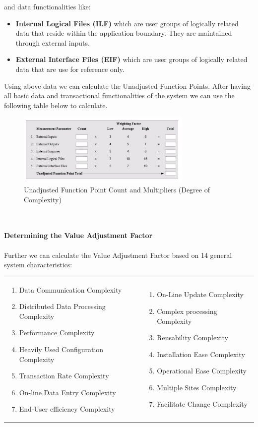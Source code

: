 \documentclass[
	11pt,
	a4paper
]{article}%
\begin{document}
and data functionalities like:
\begin{itemize}
\item \textbf{Internal Logical Files (ILF)} which are user groups of logically related data that reside within the application boundary. They are maintained through external inputs.
\item \textbf{External Interface Files (EIF)} which are user groups of logically related data that are use for reference only.
\end{itemize}
Using above data we can calculate the Unadjusted Function Points. After having all basic data and transactional functionalities of the system we can use the following table below to calculate.
\begin{figure}[h!]
  \caption{Unadjusted Function Point Count and Multipliers (Degree of Complexity)}
  \centering
    \includegraphics[width=0.75\textwidth]{../Images/FP.png}
\end{figure}\\\\
\textbf{Determining the Value Adjustment Factor}\\\\
Further we can calculate the Value Adjustment Factor based on 14 general system characteristics:

\begin{tabular}{ll}
 \parbox{8cm}{
 \begin{enumerate}
	\item Data Communication Complexity
	\item Distributed Data Processing Complexity
	\item Performance Complexity
	\item Heavily Used Configuration Complexity
	\item Transaction Rate Complexity
	\item On-line Data Entry Complexity
	\item End-User efficiency Complexity
 \end{enumerate}}
 &
 \parbox{7.5cm}{
 \begin{enumerate}
	\item On-Line Update Complexity
	\item Complex processing Complexity
	\item Reusability Complexity
	\item Installation Ease Complexity
	\item Operational Ease Complexity
	\item Multiple Sites Complexity
	\item Facilitate Change Complexity
 \end{enumerate}}
\end{tabular}
\end{document}
